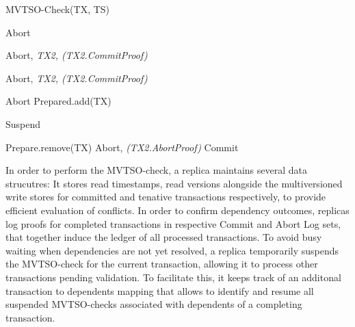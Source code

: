 \begin{algorithm}
\caption{MVTSO-Check(TX, TS)}\label{mvtso}
\begin{algorithmic}[1]
\State \Return Abort
\EndIf

          \State  \Return Abort, \textit{TX2, (TX2.CommitProof)}  
         \EndIf  
\EndFor

          \State  \Return Abort, \textit{TX2, (TX2.CommitProof)}
         
        \EndIf
          \State  \Return Abort
       \EndIf
\EndFor
\State Prepared.add(TX) 

\State Suspend
\EndWhile

		\State	Prepare.remove(TX)
		\State \Return Abort, \textit{(TX2.AbortProof)}
		\EndIf
\EndFor
\State \Return Commit
\end{algorithmic}

\end{algorithm}

In order to perform the MVTSO-check, a replica maintains several data strucutres: \one It stores read timestamps, read versions alongside the multiversioned write stores for committed and tenative transactions respectively, to provide efficient evaluation of conflicts.
\two In order to confirm dependency outcomes, replicas log proofs for completed transactions in respective Commit and Abort Log sets, that together induce the ledger of all processed transactions. 
\three To avoid busy waiting when dependencies are not yet resolved, a replica temporarily suspends the MVTSO-check for the current transaction, allowing it to process other transactions pending validation. To facilitate this, it keeps track of an additonal transaction to dependents mapping that allows to identify and resume all suspended MVTSO-checks associated with dependents of a completing transaction.

